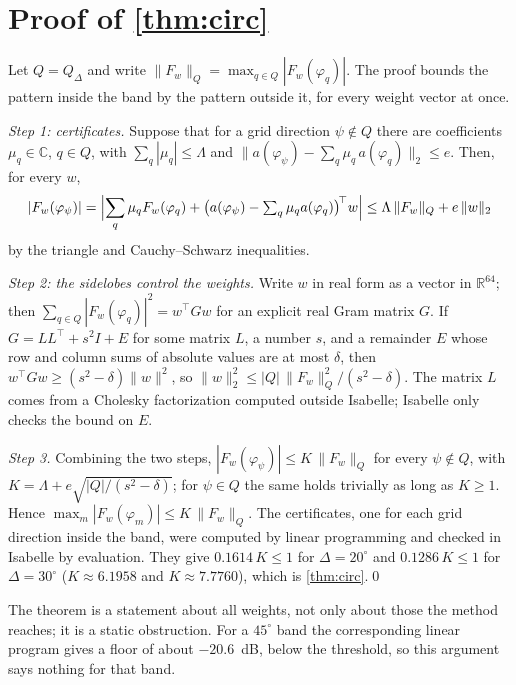 \documentclass[11pt]{amsart}
\theoremstyle{plain}
\theoremstyle{definition}
\newcommand{\thy}[1]{\texttt{#1}}
\newcommand{\C}{\mathbb{C}}
\newcommand{\R}{\mathbb{R}}
\begin{document}
\section{Proof of \texorpdfstring{\cref{thm:circ}}{Theorem 3}}\label{sec:proof-circ}

Let $Q = Q_\Delta$ and write $\|F_w\|_Q = \max_{q \in Q} |F_w(\varphi_q)|$.  The proof bounds the pattern
inside the band by the pattern outside it, for every weight vector at once.

\emph{Step 1: certificates.}  Suppose that for a grid direction $\psi \notin Q$ there are coefficients
$\mu_q \in \C$, $q \in Q$, with $\sum_q |\mu_q| \le \Lambda$ and
$\bigl\|a(\varphi_\psi) - \sum_q \mu_q\, a(\varphi_q)\bigr\|_2 \le e$.  Then, for every $w$,
\[ |F_w(\varphi_\psi)| = \Bigl|\sum_q \mu_q F_w(\varphi_q) + \bigl(a(\varphi_\psi) - \textstyle\sum_q \mu_q a(\varphi_q)\bigr)^{\!\top} w\Bigr|
\le \Lambda\, \|F_w\|_Q + e\,\|w\|_2 \]
by the triangle and Cauchy--Schwarz inequalities.

\emph{Step 2: the sidelobes control the weights.}  Write $w$ in real form as a vector in $\R^{64}$; then
$\sum_{q \in Q} |F_w(\varphi_q)|^2 = w^\top G w$ for an explicit real Gram matrix $G$.  If
$G = L L^\top + s^2 I + E$ for some matrix $L$, a number $s$, and a remainder $E$ whose row and column
sums of absolute values are at most $\delta$, then $w^\top G w \ge (s^2 - \delta)\|w\|^2$, so
$\|w\|_2^2 \le |Q|\, \|F_w\|_Q^2 / (s^2 - \delta)$.  The matrix $L$ comes from a Cholesky
factorization computed outside Isabelle; Isabelle only checks the bound on $E$.

\emph{Step 3.}  Combining the two steps, $|F_w(\varphi_\psi)| \le K\, \|F_w\|_Q$ for every $\psi \notin Q$,
with $K = \Lambda + e\sqrt{|Q|/(s^2 - \delta)}$; for $\psi \in Q$ the same holds trivially as long as
$K \ge 1$.  Hence $\max_m |F_w(\varphi_m)| \le K\, \|F_w\|_Q$.  The certificates, one for each grid
direction inside the band, were computed by linear programming and checked in Isabelle by evaluation.
They give $0.1614\,K \le 1$ for $\Delta = 20^\circ$ and $0.1286\,K \le 1$ for $\Delta = 30^\circ$
($K \approx 6.1958$ and $K \approx 7.7760$), which is \cref{thm:circ}.\qed




The theorem is a statement about all weights, not only about those the method reaches; it is a
static obstruction.  For a $45^\circ$ band the corresponding linear program gives a floor of about
$-20.6$~dB, below the threshold, so this argument says nothing for that band.
\end{document}
